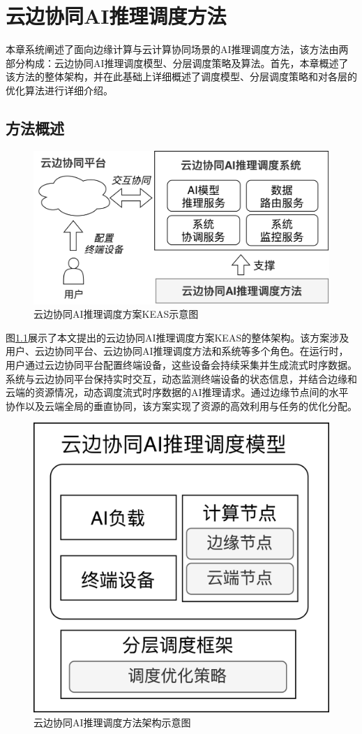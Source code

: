 
\chapter{云边协同AI推理调度方法}

本章系统阐述了面向边缘计算与云计算协同场景的AI推理调度方法，该方法由两部分构成：云边协同AI推理调度模型、分层调度策略及算法。首先，本章概述了该方法的整体架构，并在此基础上详细概述了调度模型、分层调度策略和对各层的优化算法进行详细介绍。

\section{方法概述}







\begin{figure}[h]
  \centering
  \includegraphics[width=0.7\linewidth]{pics/3-all.png}
  \caption{云边协同AI推理调度方案KEAS示意图}
  \label{fig:3-all}
\end{figure}

图\ref{fig:3-all}展示了本文提出的云边协同AI推理调度方案KEAS的整体架构。该方案涉及用户、云边协同平台、云边协同AI推理调度方法和系统等多个角色。在运行时，用户通过云边协同平台配置终端设备，这些设备会持续采集并生成流式时序数据。系统与云边协同平台保持实时交互，动态监测终端设备的状态信息，并结合边缘和云端的资源情况，动态调度流式时序数据的AI推理请求。通过边缘节点间的水平协作以及云端全局的垂直协同，该方案实现了资源的高效利用与任务的优化分配。

\begin{figure}[ht]
  \centering
  \includegraphics[width=0.4\linewidth]{pics/3-0架构.png}
  \caption{云边协同AI推理调度方法架构示意图}
  \label{fig:3-0arch}
\end{figure}

